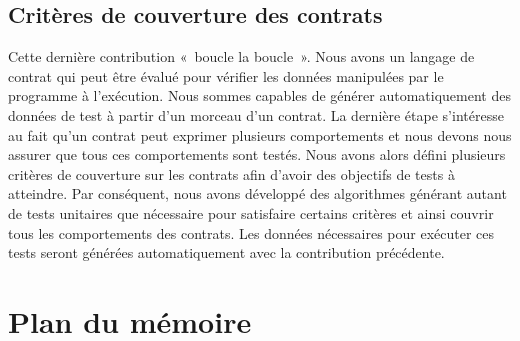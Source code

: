 \subsection{Critères de couverture des contrats}

Cette dernière contribution «~boucle la boucle~». Nous avons un langage de
contrat qui peut être évalué pour vérifier les données manipulées par le
programme à l'exécution. Nous sommes capables de générer automatiquement des
données de test à partir d'un morceau d'un contrat. La dernière étape
s'intéresse au fait qu'un contrat peut exprimer plusieurs comportements et nous
devons nous assurer que tous ces comportements sont testés. Nous avons alors
défini plusieurs critères de couverture sur les contrats afin d'avoir des
objectifs de tests à atteindre. Par conséquent, nous avons développé des
algorithmes générant autant de tests unitaires que nécessaire pour satisfaire
certains critères et ainsi couvrir tous les comportements des contrats. Les
données nécessaires pour exécuter ces tests seront générées automatiquement avec
la contribution précédente.

\section{Plan du mémoire}

